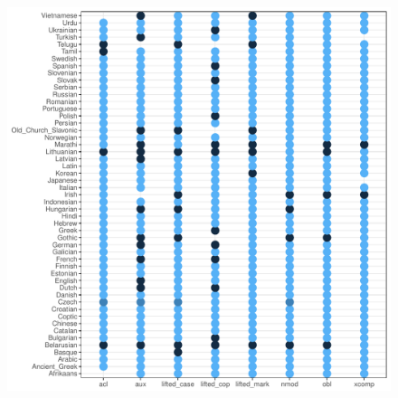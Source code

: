 \documentclass[12pt]{article}
\begin{document}
\begin{figure}
    \includegraphics[scale=.25]{../results/correlations/figures/coverage-two-lambda09-best.pdf}
    

\end{figure}
\end{document}

